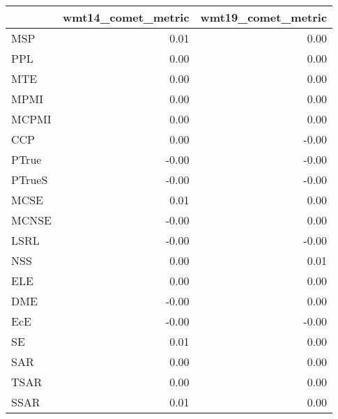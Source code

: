 \begin{tabular}{lrr}
\toprule
 & wmt14\_comet\_metric & wmt19\_comet\_metric \\
\midrule
MSP & 0.01 & 0.00 \\
PPL & 0.00 & 0.00 \\
MTE & 0.00 & 0.00 \\
MPMI & 0.00 & 0.00 \\
MCPMI & 0.00 & 0.00 \\
CCP & 0.00 & -0.00 \\
PTrue & -0.00 & -0.00 \\
PTrueS & -0.00 & -0.00 \\
MCSE & 0.01 & 0.00 \\
MCNSE & -0.00 & 0.00 \\
LSRL & -0.00 & -0.00 \\
NSS & 0.00 & 0.01 \\
ELE & 0.00 & 0.00 \\
DME & -0.00 & 0.00 \\
EcE & -0.00 & -0.00 \\
SE & 0.01 & 0.00 \\
SAR & 0.00 & 0.00 \\
TSAR & 0.00 & 0.00 \\
SSAR & 0.01 & 0.00 \\
\bottomrule
\end{tabular}
